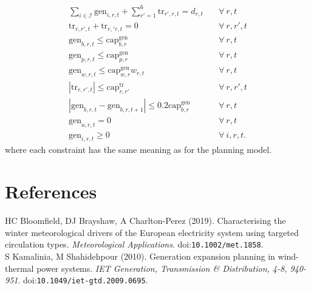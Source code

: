 \documentclass[preprint]{elsarticle}
\begin{document}
\begin{align}
\sum_{i \in \mathcal{I}} \text{gen}_{i,r,t} + \sum_{r'=1}^6 \text{tr}_{r',r,t} = d_{r,t} \quad & \forall \: r, t \label{eq:model_4:demand_met} \\
\text{tr}_{r,r',t} + \text{tr}_{r,'r,t} = 0 \quad & \forall \: r, r', t \label{eq:model_4:tr_balance} \\
\text{gen}_{b,r,t} \le \text{cap}_{b,r}^\text{gen} \quad & \forall \: r, t \label{eq:model_4:gen_le_cap_b} \\
\text{gen}_{p,r,t} \le \text{cap}_{p,r}^\text{gen} \quad & \forall \: r, t \label{eq:model_4:gen_le_cap_p} \\
\text{gen}_{w,r,t} \le \text{cap}_{w,r}^\text{gen} w_{r,t} \quad & \forall \: r, t \label{eq:model_4:gen_le_cap_w} \\
|\text{tr}_{r,r',t}| \le \text{cap}_{r,r'}^\text{tr} \quad & \forall \: r, r', t \label{eq:model_4:tr_le_cap_tr} \\
|\text{gen}_{b,r,t} - \text{gen}_{b,r,t+1}| \le 0.2 \text{cap}_{b,r}^\text{gen} \quad & \forall \: r, t \label{eq:model_4:ramping} \\
\text{gen}_{u,r,t} = 0 \quad & \forall \: r, t \label{eq:model_3:no_unmet} \\
\text{gen}_{i,r,t} \ge 0 \quad & \forall \: i, r, t. \label{eq:model_4:ge_0}
\end{align}
\noindent where each constraint has the same meaning as for the planning model.



\section{References}
\label{sec:references}

\noindent HC Bloomfield, DJ Brayshaw, A Charlton-Perez (2019). Characterising the winter meteorological drivers of the European electricity system using targeted circulation types. \textit{Meteorological Applications}. doi:\texttt{10.1002/met.1858}. \\

\noindent S Kamalinia, M Shahidehpour (2010). Generation expansion planning in wind-thermal power systems. \textit{IET Generation, Transmission \& Distribution, 4-8, 940-951}. doi:\texttt{10.1049/iet-gtd.2009.0695}.
\end{document}
